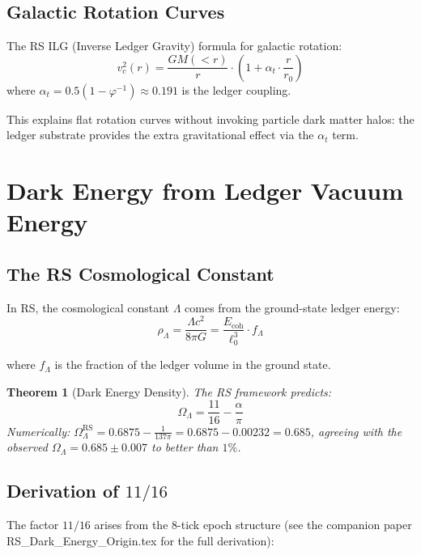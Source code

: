 \documentclass[12pt,a4paper]{article}
\newtheorem{theorem}{Theorem}[section]
\theoremstyle{definition}
\theoremstyle{remark}
\begin{document}
\subsection{Galactic Rotation Curves}

The RS ILG (Inverse Ledger Gravity) formula for galactic rotation:
\begin{equation}
v_c^2(r) = \frac{GM(<r)}{r} \cdot \left(1 + \alpha_t \cdot \frac{r}{r_0}\right)
\end{equation}
where $\alpha_t = 0.5(1 - \varphi^{-1}) \approx 0.191$ is the ledger coupling.

This explains flat rotation curves without invoking particle dark matter halos:
the ledger substrate provides the extra gravitational effect via the $\alpha_t$ term.

\section{Dark Energy from Ledger Vacuum Energy}

\subsection{The RS Cosmological Constant}

In RS, the cosmological constant $\Lambda$ comes from the ground-state ledger energy:
\begin{equation}
\rho_\Lambda = \frac{\Lambda c^2}{8\pi G} = \frac{E_\mathrm{coh}}{\ell_0^3} \cdot f_\Lambda
\end{equation}

where $f_\Lambda$ is the fraction of the ledger volume in the ground state.

\begin{theorem}[Dark Energy Density]\label{thm:omega-lambda}
The RS framework predicts:
\begin{equation}
\Omega_\Lambda = \frac{11}{16} - \frac{\alpha}{\pi}
\end{equation}
Numerically: $\Omega_\Lambda^\mathrm{RS} = 0.6875 - \frac{1}{137\pi} = 0.6875 - 0.00232 = 0.685$, agreeing with the observed $\Omega_\Lambda = 0.685 \pm 0.007$ to better than $1\%$.
\end{theorem}

\subsection{Derivation of $11/16$}

The factor $11/16$ arises from the 8-tick epoch structure (see
the companion paper RS\_Dark\_Energy\_Origin.tex for the full
derivation):
\end{document}
